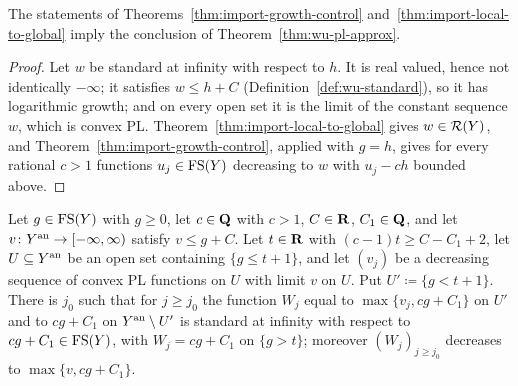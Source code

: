 \begin{lemma}\label{lem:wu-pl-special-case}
\leanok
{}
The statements of Theorems~\ref{thm:import-growth-control} and~\ref{thm:import-local-to-global} imply the
conclusion of Theorem~\ref{thm:wu-pl-approx}.
\end{lemma}

\begin{proof}
Let $w$ be standard at infinity with respect to $h$. It is real valued, hence not identically $-\infty$; it
satisfies $w\le h+C$ (Definition~\ref{def:wu-standard}), so it has logarithmic growth; and on every open
set it is the limit of the constant sequence $w$, which is convex PL. Theorem~\ref{thm:import-local-to-global}
gives $w\in\mathcal{R}(Y)$, and Theorem~\ref{thm:import-growth-control}, applied with $g=h$, gives for every
rational $c>1$ functions $u_j\in\mathrm{FS}(Y)$ decreasing to $w$ with $u_j-ch$ bounded above.
\end{proof}

\begin{lemma}\label{lem:wu-collar}
\leanok
{}
Let $g\in\mathrm{FS}(Y)$ with $g\ge0$, let $c\in\mathbf{Q}$ with $c>1$, $C\in\mathbf{R}$, $C_1\in\mathbf{Q}$, and let
$v\colon Y^{\mathrm{an}}\to[-\infty,\infty)$ satisfy $v\le g+C$. Let $t\in\mathbf{R}$ with $(c-1)t\ge C-C_1+2$, let
$U\subseteq Y^{\mathrm{an}}$ be an open set containing $\{g\le t+1\}$, and let $(v_j)$ be a decreasing sequence of
convex PL functions on $U$ with limit $v$ on $U$. Put $U'\coloneqq\{g<t+1\}$. There is $j_0$ such that for
$j\ge j_0$ the function $W_j$ equal to $\max\{v_j,cg+C_1\}$ on $U'$ and to $cg+C_1$ on $Y^{\mathrm{an}}\setminus U'$
is standard at infinity with respect to $cg+C_1\in\mathrm{FS}(Y)$, with $W_j=cg+C_1$ on $\{g>t\}$; moreover
$(W_j)_{j\ge j_0}$ decreases to $\max\{v,cg+C_1\}$.
\end{lemma}


